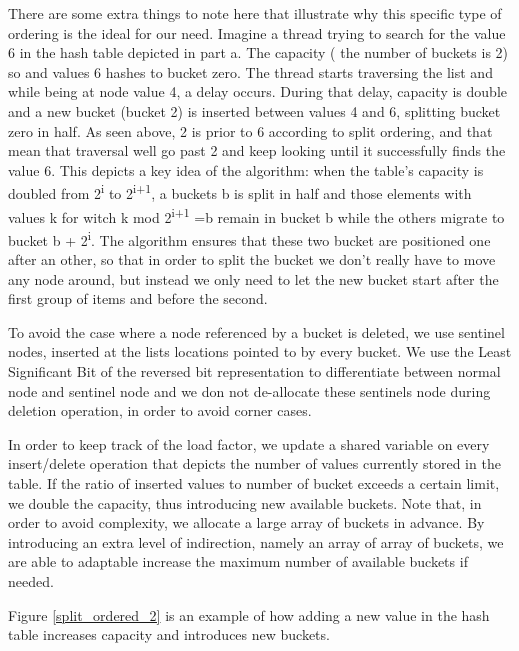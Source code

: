 There are some extra things to note here that illustrate why this specific type of ordering is the ideal for our need. Imagine a thread trying to search for the value 6 in the hash table depicted in part a. The capacity ( the number of buckets is 2) so and values 6 hashes to bucket zero. The thread starts traversing the list and while being at node value 4, a delay occurs. During that delay, capacity is double and a new bucket (bucket 2) is inserted between values 4 and 6, splitting bucket zero in half. As seen above, 2 is prior to 6 according to split ordering, and that mean that traversal well go past 2 and keep looking until it successfully finds the value 6. This depicts a key idea of the algorithm: when the table's capacity is doubled from 2\textsuperscript{i} to 2\textsuperscript{i+1}, a buckets b is split in half and those elements with values k for witch k mod 2\textsuperscript{i+1} =b  remain in bucket b while the others migrate to bucket b + 2\textsuperscript{i}. The algorithm ensures that these two bucket are positioned one after an other, so that in order to split the bucket we don’t really have to move any node around, but instead we only need to let the new bucket start after the first group of items and before the second.

To avoid the case where a node referenced by a bucket is deleted, we use sentinel nodes, inserted at the lists locations pointed to by every bucket. We use the Least Significant Bit of the reversed bit representation to differentiate between normal node and sentinel node and we don not de-allocate these sentinels node during deletion operation, in order to avoid corner cases.

In order to keep track of the load factor, we update a shared variable on every insert/delete operation that depicts the number of values currently stored in the table. If the ratio of inserted values to number of bucket exceeds a certain limit, we double the capacity, thus introducing new available buckets. Note that, in order to avoid complexity, we allocate a large array of buckets in advance. By introducing an extra level of indirection, namely an array of array of buckets, we are able to adaptable increase the maximum number of available buckets if needed.

Figure \ref{split_ordered_2} is an example of how adding a new value in the hash table increases capacity and introduces new buckets.

